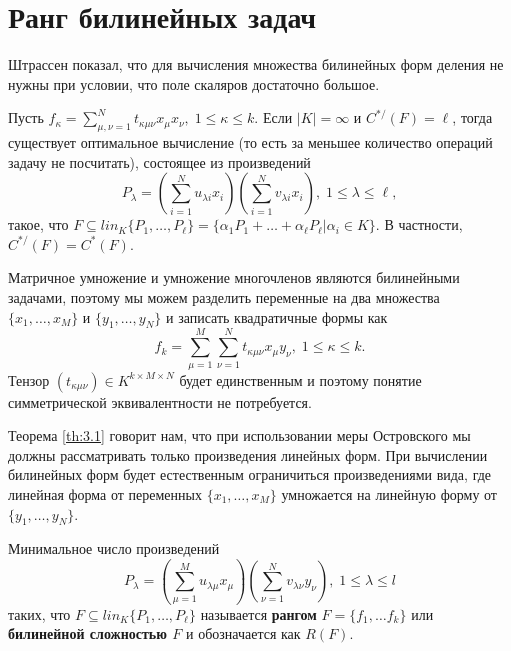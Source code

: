 \section{Ранг билинейных задач}

Штрассен \cite{Strassen:1973} показал, что для вычисления множества билинейных форм деления не нужны при условии, что поле скаляров достаточно большое.

\begin{theorem}\label{th:3.1}
Пусть $f_\kappa = \sum\limits_{\mu,\nu=1}^{N} t_{\kappa \mu \nu} x_\mu x_\nu, \; 1 \leq \kappa \leq k$. Если $|K| = \infty$ и $C^{*/}(F)=\ell$, тогда существует оптимальное вычисление (то есть за меньшее количество операций задачу не посчитать), состоящее из произведений
\[
	P_\lambda = \left( \sum\limits_{i=1}^{N} u_{\lambda i} x_i  \right) \left( \sum\limits_{i=1}^{N} v_{\lambda i} x_i  \right), \; 1 \leq \lambda \leq \ell,
\]  
такое, что $F \subseteq lin_K \{ P_1 , \ldots, P_\ell  \} = \{ \alpha_1 P_1 + \ldots + \alpha_\ell P_\ell |\alpha_i \in K \}$. В частности, $C^{*/}(F)=C^{*}(F)$.
\end{theorem}

Матричное умножение и умножение многочленов являются билинейными задачами, поэтому мы можем разделить переменные на два множества $\{ x_1, \ldots, x_M  \}$ и $\{ y_1, \ldots, y_N  \}$ и записать квадратичные формы как 
\[
	f_k = \sum\limits_{\mu=1}^{M} \sum\limits_{\nu=1}^{N} t_{\kappa \mu \nu} x_\mu y_\nu, \; 1 \leq \kappa \leq k.
\]
Тензор $(t_{\kappa \mu \nu}) \in K^{k \times M \times N}$ будет единственным и поэтому понятие симметрической эквивалентности не потребуется.

Теорема \ref{th:3.1} говорит нам, что при использовании меры Островского мы должны рассматривать только произведения линейных форм. При вычислении билинейных форм будет естественным ограничиться произведениями вида, где линейная форма от переменных $\{ x_1, \ldots, x_M  \}$  умножается на линейную форму от $\{ y_1, \ldots, y_N  \}$.

\begin{definition}
  Минимальное число произведений
  \[
  	P_\lambda = \left( \sum\limits_{\mu=1}^{M} u_{\lambda \mu} x_\mu \right) \left( \sum\limits_{\nu=1}^{N} v_{\lambda \nu} y_\nu \right),\; 1 \leq \lambda \leq l
  \]
  таких, что $F \subseteq lin_K \{ P_1 , \ldots, P_\ell  \}$ называется \textbf{рангом} $F = \{ f_1, \ldots f_k \}$ или \textbf{билинейной сложностью $F$} и обозначается как $R(F)$.
\end{definition}


